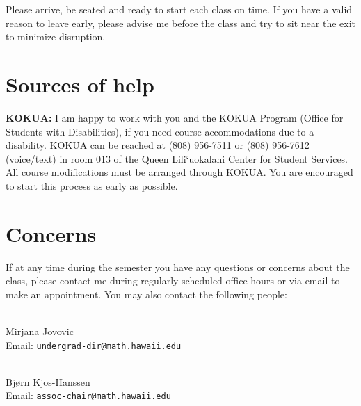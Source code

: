 \documentclass[12pt]{amsart}
\newcommand{\spacer}{\vspace{.2cm}}
\newcommand{\svs}{\vspace{.1cm}}
\begin{document}
Please arrive, be seated and ready to start each class on time. If you have a valid reason to leave early, please advise me before the class and try to sit near the exit to minimize disruption.

\section*{Sources of help}

{\bf KOKUA:} I am happy to work with you and the KOKUA Program (Office for Students with Disabilities), if you need course accommodations due to a disability. KOKUA can be reached at (808) 956-7511 or (808) 956-7612 (voice/text) in room 013 of the Queen Lili`uokalani Center for Student Services. All course modifications must be arranged through KOKUA. You are encouraged to start this process as early as possible.

\section*{Concerns}
If at any time during the semester you have any questions or concerns about the class, please contact me during regularly scheduled office hours or via email to make an appointment. You may also contact the following people:
\spacer

\\
Mirjana Jovovic \\
Email: \texttt{undergrad-dir@math.hawaii.edu}

\svs
{}\\
Bj{\o}rn Kjos-Hanssen \\
Email: \texttt{assoc-chair@math.hawaii.edu}
\end{document}
